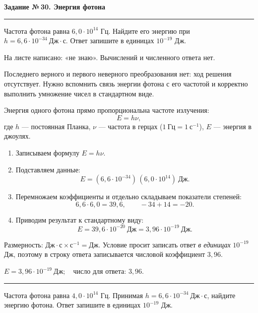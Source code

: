 \documentclass[a4paper,11pt]{article}
\newcommand{\themelabel}[1]{\par\vspace{0.20em}\noindent{\bfseries\textcolor{darkaccent}{#1}}\par\vspace{-0.42em}}
\newcommand{\errorlabel}[1]{\par\vspace{0.20em}\noindent{\bfseries\textcolor{error}{#1}}\par\vspace{-0.42em}}
\newcommand{\tasktitle}[2]{\phantomsection\label{task:#1}{\Large\bfseries\textcolor{darkaccent}{Задание №\,#1. #2}}\par\medskip\noindent\textcolor{accent}{\rule{\linewidth}{0.7pt}}\par\medskip}
\newcommand{\checkline}{\par\vspace{0.45em}\noindent\textcolor{accent}{\rule{\linewidth}{0.4pt}}\par}
\begin{document}
\tasktitle{30}{Энергия фотона}
\themelabel{Текст задания}
Частота фотона равна $6{,}0\cdot10^{14}$ Гц. Найдите его энергию при $h=6{,}6\cdot10^{-34}\ \text{Дж}\cdot\text{с}$. Ответ запишите в единицах $10^{-19}$ Дж.

\themelabel{Ваше решение и ответ}
На листе написано: «не знаю». Вычислений и численного ответа нет.

\errorlabel{Что осталось невыполненным}
Последнего верного и первого неверного преобразования нет: ход решения отсутствует. Нужно вспомнить связь энергии фотона с его частотой и корректно выполнить умножение чисел в стандартном виде.

\themelabel{Ключевая идея}
Энергия одного фотона прямо пропорциональна частоте излучения:
\[
\boxed{E=h\nu,}
\]
где $h$ --- постоянная Планка, $\nu$ --- частота в герцах ($1\ \text{Гц}=1\ \text{с}^{-1}$), $E$ --- энергия в джоулях.

\themelabel{Полное правильное решение}
\begin{enumerate}[leftmargin=*,itemsep=0.16em]
\item Записываем формулу $E=h\nu$.
\item Подставляем данные:
\[
E=(6{,}6\cdot10^{-34})\,(6{,}0\cdot10^{14})\ \text{Дж}.
\]
\item Перемножаем коэффициенты и отдельно складываем показатели степеней:
\[
6{,}6\cdot6{,}0=39{,}6,\qquad -34+14=-20.
\]
\item Приводим результат к стандартному виду:
\[
E=39{,}6\cdot10^{-20}\ \text{Дж}
=3{,}96\cdot10^{-19}\ \text{Дж}.
\]
\end{enumerate}

\themelabel{Проверка}
Размерность: $\text{Дж}\cdot\text{с}\times\text{с}^{-1}=\text{Дж}$. Условие просит записать ответ \emph{в единицах} $10^{-19}$ Дж, поэтому в строку ответа записывается числовой коэффициент $3{,}96$.

\themelabel{Итог}
\(\boxed{E=3{,}96\cdot10^{-19}\ \text{Дж};\quad \text{число для ответа: }3{,}96.}\)
\checkline
\themelabel{Задача на закрепление}
Частота фотона равна $4{,}0\cdot10^{14}$ Гц. Принимая $h=6{,}6\cdot10^{-34}\ \text{Дж}\cdot\text{с}$, найдите энергию фотона. Ответ запишите в единицах $10^{-19}$ Дж.
\end{document}

